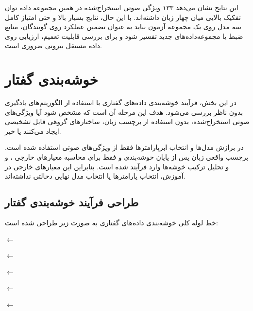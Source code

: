 \documentclass[12pt,a4paper,oneside]{report}
\begin{document}
این نتایج نشان می‌دهد ۱۳۳ ویژگی صوتی استخراج‌شده در همین مجموعه داده توان
تفکیک بالایی میان چهار زبان داشته‌اند. با این حال، نتایج بسیار بالا و حتی
امتیاز کامل سه مدل روی یک مجموعه آزمون نباید به عنوان تضمین عملکرد روی
گویندگان، منابع ضبط یا مجموعه‌داده‌های جدید تفسیر شود و برای بررسی قابلیت
تعمیم، ارزیابی روی داده مستقل بیرونی ضروری است.

\section{خوشه‌بندی گفتار}

در این بخش، فرآیند خوشه‌بندی داده‌های گفتاری با استفاده از الگوریتم‌های
یادگیری بدون ناظر بررسی می‌شود. هدف این مرحله آن است که مشخص شود آیا
ویژگی‌های صوتی استخراج‌شده، بدون استفاده از برچسب زبان، ساختارهای گروهی
قابل تشخیصی ایجاد می‌کنند یا خیر.

در برازش مدل‌ها و انتخاب ابرپارامترها فقط از ویژگی‌های صوتی استفاده شده
است. برچسب واقعی زبان پس از پایان خوشه‌بندی و فقط برای محاسبه معیارهای
خارجی ،  و  و تحلیل ترکیب خوشه‌ها وارد فرآیند
شده است. بنابراین این معیارهای خارجی در آموزش، انتخاب پارامترها یا انتخاب
مدل نهایی دخالتی نداشته‌اند.


\subsection{طراحی فرآیند خوشه‌بندی گفتار}

خط لوله کلی خوشه‌بندی داده‌های گفتاری به صورت زیر طراحی شده است:

\begin{center}


$\longleftarrow$


$\longleftarrow$


$\longleftarrow$


$\longleftarrow$


$\longleftarrow$


\end{center}
\end{document}
